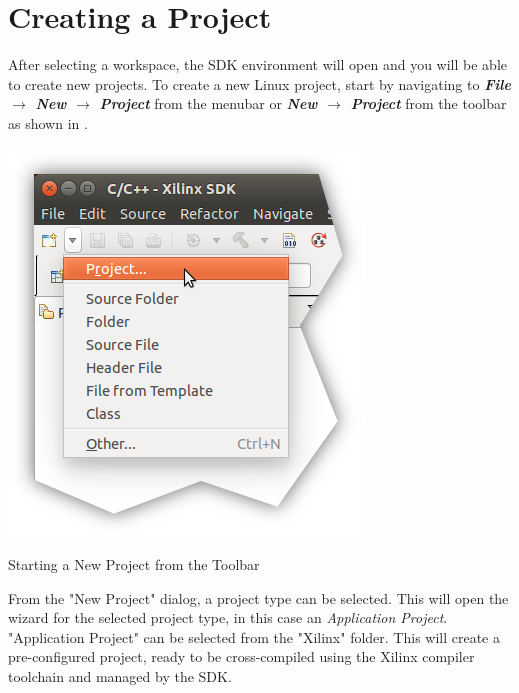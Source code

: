 \section{Creating a Project}

\noindent
After selecting a workspace, the SDK environment will open and you will be able to create new projects. To create a new Linux project, start by navigating to \textit{\bfseries File $\rightarrow$ New $\rightarrow$ Project} from the menubar or \textit{\bfseries New $\rightarrow$ Project} from the toolbar as shown in . \\

\begin{marginfigure}
	\centering
	\includegraphics{images/New_Project.png}
	\caption[Starting a New Project from the Toolbar]{Starting a New Project from the Toolbar}
	\label{fig:newproject}
\end{marginfigure}


\noindent
From the "New Project" dialog, a project type can be selected. This will open the wizard for the selected project type, in this case an \textit{Application Project}. "Application Project" can be selected from the "Xilinx" folder. This will create a pre-configured project, ready to be cross-compiled using the Xilinx compiler toolchain and managed by the SDK. \\

